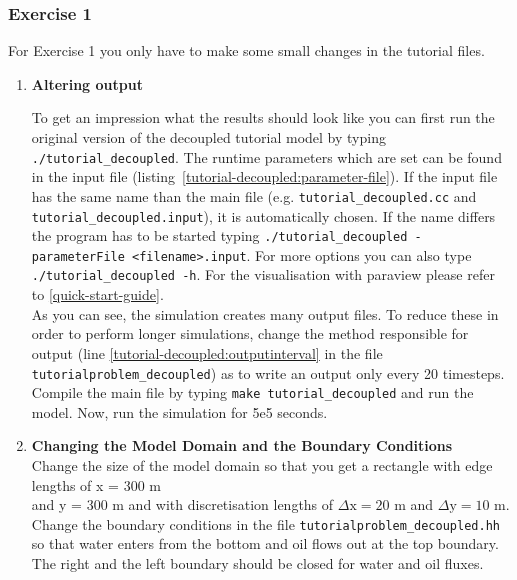 \subsubsection{Exercise 1}
\renewcommand{\labelenumi}{\alph{enumi})}
For Exercise 1 you only have to make some small changes in the tutorial files.
\begin{enumerate}
\item \textbf{Altering output}

To get an impression what the results should look like you can first run the original version of the decoupled tutorial model by typing  \texttt{./tutorial\_decoupled}. The runtime parameters which are set can be found in the input file (listing~\ref{tutorial-decoupled:parameter-file}). If the input file has the same name than the main file (e.g. \texttt{tutorial\_decoupled.cc} and \texttt{tutorial\_decoupled.input}), it is automatically chosen. If the name differs the program has to be started typing \texttt{./tutorial\_decoupled -parameterFile <filename>.input}. For more options you can also type \texttt{./tutorial\_decoupled -h}. For the visualisation with paraview please refer to \ref{quick-start-guide}.\\
As you can see, the simulation creates many output files. To reduce these in order to perform longer simulations, change the method responsible for output (line \ref{tutorial-decoupled:outputinterval} in the file \texttt{tutorialproblem\_decoupled}) as to write an output only every 20 timesteps. Compile the main file by typing \texttt{make tutorial\_decoupled} and run the model. Now, run the simulation for 5e5 seconds.

\item \textbf{Changing the Model Domain and the Boundary Conditions} \\
Change the size of the model domain so that you get a rectangle
with edge lengths of x = 300 m \\  and y = 300 m and with discretisation lengths of  $\Delta \text{x} = 20$ m and $\Delta \text{y} = 10$ m. \\
Change the boundary conditions in the file \texttt{tutorialproblem\_decoupled.hh} so that water enters from the bottom and oil flows out at the top boundary. The right and the left boundary should be closed for water and oil fluxes.


\end{enumerate}
